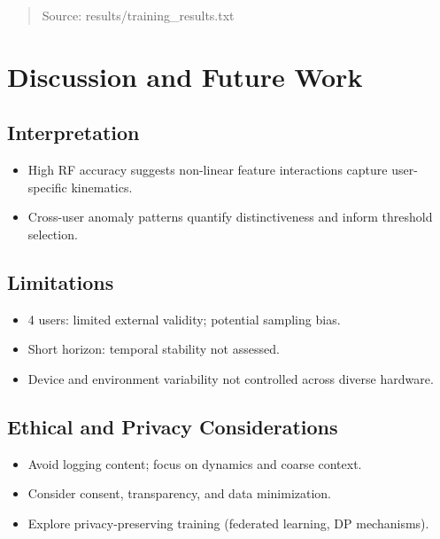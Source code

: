 \documentclass[
  12pt,
]{article}
\providecommand{\tightlist}{%
  \setlength{\itemsep}{0pt}\setlength{\parskip}{0pt}}
\begin{document}
\begin{quote}
Source: results/training\_results.txt
\end{quote}

\section{Discussion and Future Work}\label{discussion-and-future-work}

\subsection{Interpretation}\label{interpretation}

\begin{itemize}
\tightlist
\item
  High RF accuracy suggests non-linear feature interactions capture
  user-specific kinematics.
\item
  Cross-user anomaly patterns quantify distinctiveness and inform
  threshold selection.
\end{itemize}

\subsection{Limitations}\label{limitations}

\begin{itemize}
\tightlist
\item
  4 users: limited external validity; potential sampling bias.
\item
  Short horizon: temporal stability not assessed.
\item
  Device and environment variability not controlled across diverse
  hardware.
\end{itemize}

\subsection{Ethical and Privacy
Considerations}\label{ethical-and-privacy-considerations}

\begin{itemize}
\tightlist
\item
  Avoid logging content; focus on dynamics and coarse context.
\item
  Consider consent, transparency, and data minimization.
\item
  Explore privacy-preserving training (federated learning, DP
  mechanisms).
\end{itemize}
\end{document}
